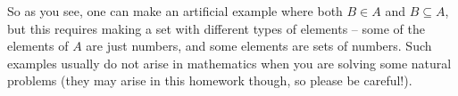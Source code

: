 \documentclass[12pt]{amsart}
\theoremstyle{plain}
\theoremstyle{definition}
\begin{document}
So as you see, one can make an artificial example where both $B\in A$ and $B\subseteq A$,
but this requires making a set with different types of elements -- some of the elements of $A$ are just numbers, and some elements are sets of numbers. Such examples usually do not arise in mathematics when you are solving some natural problems (they may arise in this homework though, so please be careful!). 
\end{document}
